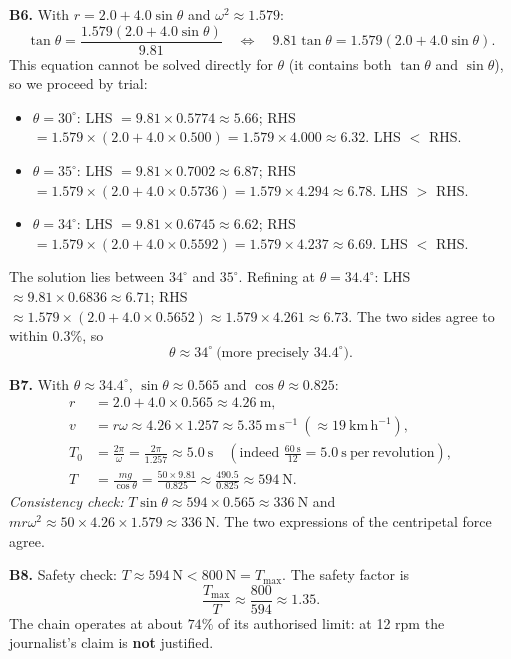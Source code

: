 \documentclass[11pt]{article}
\begin{document}
\textbf{B6.} With $r = 2.0 + 4.0\sin\theta$ and $\omega^2 \approx 1.579$:
\[ \tan\theta = \frac{1.579\left(2.0 + 4.0\sin\theta\right)}{9.81} \quad\Longleftrightarrow\quad 9.81\tan\theta = 1.579\left(2.0 + 4.0\sin\theta\right). \]
This equation cannot be solved directly for $\theta$ (it contains both $\tan\theta$ and $\sin\theta$), so we proceed by trial:
\begin{itemize}
\item $\theta = 30^{\circ}$: LHS $= 9.81 \times 0.5774 \approx 5.66$; RHS $= 1.579 \times (2.0 + 4.0 \times 0.500) = 1.579 \times 4.000 \approx 6.32$. LHS $<$ RHS.
\item $\theta = 35^{\circ}$: LHS $= 9.81 \times 0.7002 \approx 6.87$; RHS $= 1.579 \times (2.0 + 4.0 \times 0.5736) = 1.579 \times 4.294 \approx 6.78$. LHS $>$ RHS.
\item $\theta = 34^{\circ}$: LHS $= 9.81 \times 0.6745 \approx 6.62$; RHS $= 1.579 \times (2.0 + 4.0 \times 0.5592) = 1.579 \times 4.237 \approx 6.69$. LHS $<$ RHS.
\end{itemize}
The solution lies between $34^{\circ}$ and $35^{\circ}$. Refining at $\theta = 34.4^{\circ}$: LHS $\approx 9.81 \times 0.6836 \approx 6.71$; RHS $\approx 1.579 \times (2.0 + 4.0 \times 0.5652) \approx 1.579 \times 4.261 \approx 6.73$. The two sides agree to within $0.3\%$, so
\[ \boxed{\theta \approx 34^{\circ}\ \text{(more precisely } 34.4^{\circ}\text{)}}. \]

\textbf{B7.} With $\theta \approx 34.4^{\circ}$, $\sin\theta \approx 0.565$ and $\cos\theta \approx 0.825$:
\begin{align*}
r &= 2.0 + 4.0 \times 0.565 \approx 4.26\ \mathrm{m},\\
v &= r\omega \approx 4.26 \times 1.257 \approx 5.35\ \mathrm{m\,s^{-1}} \ (\approx 19\ \mathrm{km\,h^{-1}}),\\
T_0 &= \frac{2\pi}{\omega} = \frac{2\pi}{1.257} \approx 5.0\ \mathrm{s} \quad \left(\text{indeed } \frac{60\ \mathrm{s}}{12} = 5.0\ \mathrm{s\ per\ revolution}\right),\\
T &= \frac{mg}{\cos\theta} = \frac{50 \times 9.81}{0.825} \approx \frac{490.5}{0.825} \approx 594\ \mathrm{N}.
\end{align*}
\emph{Consistency check:} $T\sin\theta \approx 594 \times 0.565 \approx 336\ \mathrm{N}$ and $mr\omega^2 \approx 50 \times 4.26 \times 1.579 \approx 336\ \mathrm{N}$. The two expressions of the centripetal force agree.

\textbf{B8.} Safety check: $T \approx 594\ \mathrm{N} < 800\ \mathrm{N} = T_{\max}$. The safety factor is
\[ \frac{T_{\max}}{T} \approx \frac{800}{594} \approx 1.35. \]
The chain operates at about $74\%$ of its authorised limit: at 12 rpm the journalist's claim is \textbf{not} justified.
\end{document}

